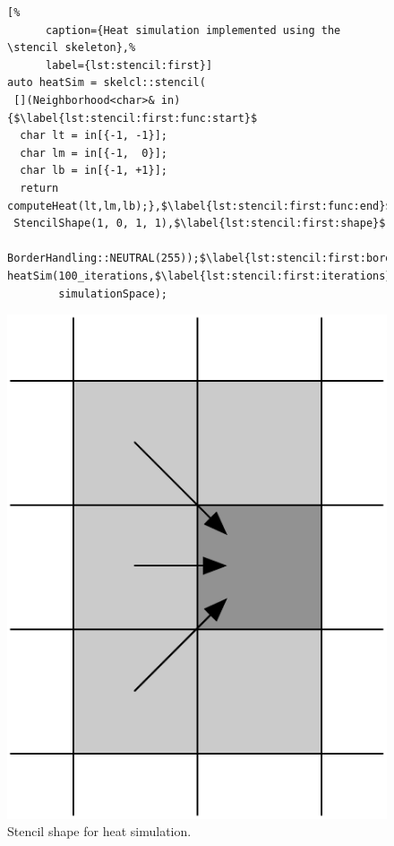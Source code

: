 \begin{figure}[t]
  \begin{minipage}[b]{.55\textwidth}
    \begin{lstlisting}[%
      caption={Heat simulation implemented using the \stencil skeleton},%
      label={lst:stencil:first}]
auto heatSim = skelcl::stencil(
 [](Neighborhood<char>& in) {$\label{lst:stencil:first:func:start}$
  char lt = in[{-1, -1}];
  char lm = in[{-1,  0}];
  char lb = in[{-1, +1}];
  return computeHeat(lt,lm,lb);},$\label{lst:stencil:first:func:end}$
 StencilShape(1, 0, 1, 1),$\label{lst:stencil:first:shape}$
 BorderHandling::NEUTRAL(255));$\label{lst:stencil:first:border}$
heatSim(100_iterations,$\label{lst:stencil:first:iterations}$
        simulationSpace);
    \end{lstlisting}
  \end{minipage}%
  \hfill%
  \begin{minipage}[b]{.38\textwidth}
    \centering
    \includegraphics[width=.65\textwidth]{Figures/HiStencils/heat_transfer}
    \caption{Stencil shape for heat simulation.\vspace{.9em}}
    \label{fig:stencil:first:shape}
  \end{minipage}
\end{figure}

